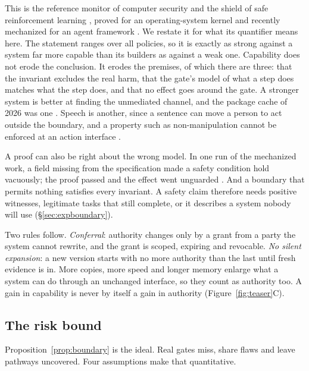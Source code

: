 \documentclass[10pt,twocolumn,letterpaper]{article}
\theoremstyle{definition}
\begin{document}
This is the reference monitor of computer security and the shield of safe reinforcement learning \cite{anderson,saltzer,schneider,alshiekh}, proved for an operating-system kernel \cite{klein} and recently mechanized for an agent framework \cite{moon}. We restate it for what its quantifier means here. The statement ranges over all policies, so it is exactly as strong against a system far more capable than its builders as against a weak one. Capability does not erode the conclusion. It erodes the premises, of which there are three: that the invariant excludes the real harm, that the gate's model of what a step does matches what the step does, and that no effect goes around the gate. A stronger system is better at finding the unmediated channel, and the package cache of 2026 was one \cite{metr}. Speech is another, since a sentence can move a person to act outside the boundary, and a property such as non-manipulation cannot be enforced at an action interface \cite{moon}.

A proof can also be right about the wrong model. In one run of the mechanized work, a field missing from the specification made a safety condition hold vacuously; the proof passed and the effect went unguarded \cite{moon}. And a boundary that permits nothing satisfies every invariant. A safety claim therefore needs positive witnesses, legitimate tasks that still complete, or it describes a system nobody will use (\S\ref{sec:expboundary}).

Two rules follow. \emph{Conferral}: authority changes only by a grant from a party the system cannot rewrite, and the grant is scoped, expiring and revocable. \emph{No silent expansion}: a new version starts with no more authority than the last until fresh evidence is in. More copies, more speed and longer memory enlarge what a system can do through an unchanged interface, so they count as authority too. A gain in capability is never by itself a gain in authority (Figure~\ref{fig:teaser}C).

\subsection{The risk bound}

Proposition~\ref{prop:boundary} is the ideal. Real gates miss, share flaws and leave pathways uncovered. Four assumptions make that quantitative.
\end{document}
